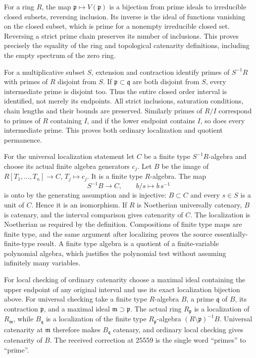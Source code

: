 For a ring \(R\), the map \(\mathfrak p\mapsto V(\mathfrak p)\) is a bijection from prime ideals to irreducible closed subsets, reversing inclusion. Its inverse is the ideal of functions vanishing on the closed subset, which is prime for a nonempty irreducible closed set. Reversing a strict prime chain preserves its number of inclusions. This proves precisely the equality of the ring and topological catenarity definitions, including the empty spectrum of the zero ring.

For a multiplicative subset \(S\), extension and contraction identify primes of \(S^{-1}R\) with primes of \(R\) disjoint from \(S\). If \(\mathfrak p\subset\mathfrak q\) are both disjoint from \(S\), every intermediate prime is disjoint too. Thus the entire closed order interval is identified, not merely its endpoints. All strict inclusions, saturation conditions, chain lengths and their bounds are preserved. Similarly primes of \(R/I\) correspond to primes of \(R\) containing \(I\), and if the lower endpoint contains \(I\), so does every intermediate prime. This proves both ordinary localization and quotient permanence.

For the universal localization statement let \(C\) be a finite type \(S^{-1}R\)-algebra and choose its actual finite algebra generators \(c_j\). Let \(B\) be the image of \(R[T_1,\ldots,T_n]\to C\), \(T_j\mapsto c_j\). It is a finite type \(R\)-algebra. The map \[
 S^{-1}B\longrightarrow C,\qquad b/s\longmapsto b\,s^{-1}
\] is onto by the generating assumption and is injective: \(B\subset C\) and every \(s\in S\) is a unit of \(C\). Hence it is an isomorphism. If \(R\) is Noetherian universally catenary, \(B\) is catenary, and the interval comparison gives catenarity of \(C\). The localization is Noetherian as required by the definition. Compositions of finite type maps are finite type, and the same argument after localizing proves the source essentially-finite-type result. A finite type algebra is a quotient of a finite-variable polynomial algebra, which justifies the polynomial test without assuming infinitely many variables.

For local checking of ordinary catenarity choose a maximal ideal containing the upper endpoint of any original interval and use its exact localization bijection above. For universal checking take a finite type \(R\)-algebra \(B\), a prime \(\mathfrak q\) of \(B\), its contraction \(\mathfrak p\), and a maximal ideal \(\mathfrak m\supset\mathfrak p\). The actual ring \(R_{\mathfrak p}\) is a localization of \(R_{\mathfrak m}\), while \(B_{\mathfrak q}\) is a localization of the finite type \(R_{\mathfrak p}\)-algebra \((R\setminus\mathfrak p)^{-1}B\). Universal catenarity at \(\mathfrak m\) therefore makes \(B_{\mathfrak q}\) catenary, and ordinary local checking gives catenarity of \(B\). The received correction at 25559 is the single word ``primes'' to ``prime''.

